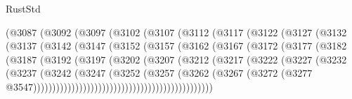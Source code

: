 \begin{lexlean}{RustStd}
\begin{coremodule}
{\begin{coremodule}
{{{{{{{{{{{{{{{{{{{{{{{{{{{{{{{{{{{{{{{{{{{{{{{{{{{{{{{{{{{{{{{{{{{{                    (@3087
                      (@3092
                        (@3097
                          (@3102
                            (@3107
                              (@3112
                                (@3117
                                  (@3122
                                    (@3127
                                      (@3132
                                        (@3137
                                          (@3142
                                            (@3147
                                              (@3152
                                                (@3157
                                                  (@3162
                                                    (@3167
                                                      (@3172
                                                        (@3177
                                                          (@3182
                                                            (@3187
                                                              (@3192
                                                                (@3197
                                                                  (@3202
                                                                    (@3207
                                                                      (@3212
                                                                        (@3217
                                                                          (@3222
                                                                            (@3227
                                                                              (@3232
                                                                                (@3237
                                                                                  (@3242
                                                                                    (@3247
                                                                                      (@3252
                                                                                        (@3257
                                                                                          (@3262
                                                                                            (@3267
                                                                                              (@3272
                                                                                                (@3277
                                                                                                  @3547)))))))))))))))))))))))))))))))))))))))))))))))
}}}}}}}}}}}}}}}}}}}}}}}}}}}}}}}}}}}}}}}}}}}}}}}}}}}}}}}}}}}}}}}}}}}}
\end{coremodule}}
\end{coremodule}
\end{lexlean}
